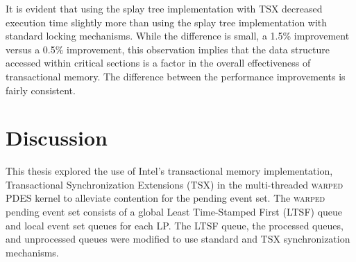 \documentclass[11pt]{book}
\begin{document}
%
%
%

It is evident that using the splay tree implementation with TSX decreased
execution time slightly more than using the splay tree implementation with
standard locking mechanisms.  While the difference is small, a 1.5\% improvement
versus a 0.5\% improvement, this observation implies that the data structure accessed
within critical sections is a factor in the overall effectiveness of
transactional memory.  The difference between the performance improvements is
fairly consistent.

\chapter{Discussion}

This thesis explored the use of Intel's transactional memory implementation, Transactional
Synchronization Extensions (TSX) in the multi-threaded \textsc{warped} PDES kernel to
alleviate contention for the pending event set.  The \textsc{warped} pending event set
consists of a global Least Time-Stamped First (LTSF) queue and local event set queues for
each LP.  The LTSF queue, the processed queues, and unprocessed queues were modified to
use standard and TSX synchronization mechanisms.
\end{document}
